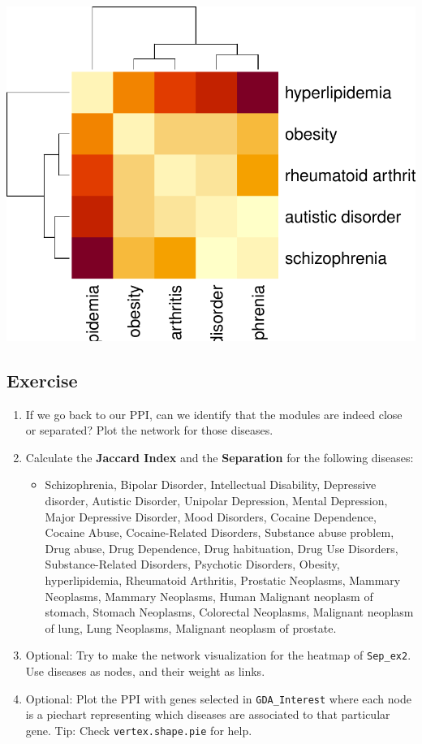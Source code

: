 \documentclass[
]{book}
\providecommand{\tightlist}{%
  \setlength{\itemsep}{0pt}\setlength{\parskip}{0pt}}
\begin{document}
\includegraphics{NetMed_files/figure-latex/unnamed-chunk-29-1.pdf}

\hypertarget{exercise}{%
\subsection{Exercise}\label{exercise}}

\begin{enumerate}
\def\labelenumi{\arabic{enumi}.}
\item
  If we go back to our PPI, can we identify that the modules are indeed close or separated? Plot the network for those diseases.
\item
  Calculate the \textbf{Jaccard Index} and the \textbf{Separation} for the following diseases:

  \begin{itemize}
  \tightlist
  \item
    Schizophrenia, Bipolar Disorder, Intellectual Disability, Depressive disorder, Autistic Disorder, Unipolar Depression, Mental Depression, Major Depressive Disorder, Mood Disorders, Cocaine Dependence, Cocaine Abuse, Cocaine-Related Disorders, Substance abuse problem, Drug abuse, Drug Dependence, Drug habituation, Drug Use Disorders, Substance-Related Disorders, Psychotic Disorders, Obesity, hyperlipidemia, Rheumatoid Arthritis, Prostatic Neoplasms, Mammary Neoplasms, Mammary Neoplasms, Human Malignant neoplasm of stomach, Stomach Neoplasms, Colorectal Neoplasms, Malignant neoplasm of lung, Lung Neoplasms, Malignant neoplasm of prostate.
  \end{itemize}
\item
  Optional: Try to make the network visualization for the heatmap of \texttt{Sep\_ex2}. Use diseases as nodes, and their weight as links.
\item
  Optional: Plot the PPI with genes selected in \texttt{GDA\_Interest} where each node is a piechart representing which diseases are associated to that particular gene. Tip: Check \texttt{vertex.shape.pie} for help.
\end{enumerate}
\end{document}
